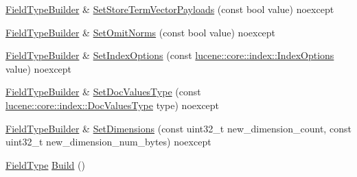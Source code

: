 \begin{DoxyCompactItemize}
\mbox{\hyperlink{classlucene_1_1core_1_1document_1_1FieldTypeBuilder}{Field\+Type\+Builder}} \& \mbox{\hyperlink{classlucene_1_1core_1_1document_1_1FieldTypeBuilder_a99929a6618ccb62254b697b8152070e4}{Set\+Store\+Term\+Vector\+Payloads}} (const bool value) noexcept
\item 
\mbox{\hyperlink{classlucene_1_1core_1_1document_1_1FieldTypeBuilder}{Field\+Type\+Builder}} \& \mbox{\hyperlink{classlucene_1_1core_1_1document_1_1FieldTypeBuilder_a0353947b265377527127242bd54866ef}{Set\+Omit\+Norms}} (const bool value) noexcept
\item 
\mbox{\hyperlink{classlucene_1_1core_1_1document_1_1FieldTypeBuilder}{Field\+Type\+Builder}} \& \mbox{\hyperlink{classlucene_1_1core_1_1document_1_1FieldTypeBuilder_a8bac1b342eb1a01f057698f04bb657ec}{Set\+Index\+Options}} (const \mbox{\hyperlink{namespacelucene_1_1core_1_1index_a0d5e1f98471a76de106056cf3b5a7897}{lucene\+::core\+::index\+::\+Index\+Options}} value) noexcept
\item 
\mbox{\hyperlink{classlucene_1_1core_1_1document_1_1FieldTypeBuilder}{Field\+Type\+Builder}} \& \mbox{\hyperlink{classlucene_1_1core_1_1document_1_1FieldTypeBuilder_afd676ba9b2f4ea66df406f81efc4558c}{Set\+Doc\+Values\+Type}} (const \mbox{\hyperlink{namespacelucene_1_1core_1_1index_a2f7ffaef6429b5df542c8aa12f8b9883}{lucene\+::core\+::index\+::\+Doc\+Values\+Type}} type) noexcept
\item 
\mbox{\hyperlink{classlucene_1_1core_1_1document_1_1FieldTypeBuilder}{Field\+Type\+Builder}} \& \mbox{\hyperlink{classlucene_1_1core_1_1document_1_1FieldTypeBuilder_afb8590925369c20efe5ac740cf9b347e}{Set\+Dimensions}} (const uint32\+\_\+t new\+\_\+dimension\+\_\+count, const uint32\+\_\+t new\+\_\+dimension\+\_\+num\+\_\+bytes) noexcept
\item 
\mbox{\hyperlink{classlucene_1_1core_1_1document_1_1FieldType}{Field\+Type}} \mbox{\hyperlink{classlucene_1_1core_1_1document_1_1FieldTypeBuilder_a3f12e4d22465ea51c7f472b95bfdc748}{Build}} ()
\end{DoxyCompactItemize}
